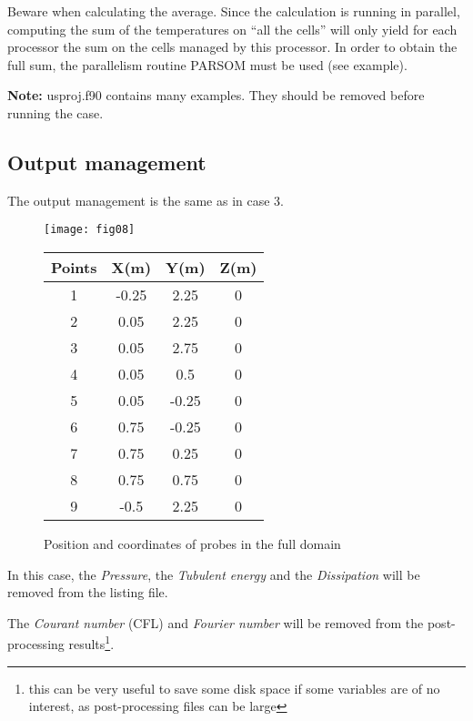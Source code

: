 Beware when calculating the average. Since the calculation is running in
parallel, computing the sum of the temperatures on ``all the cells'' will only
yield for each processor the sum on the cells managed by this processor. In
order to obtain the full sum, the parallelism routine PARSOM must be used (see
example).

\textbf{Note:} usproj.f90 contains many examples. They should be removed before
running the case.


        \subsection{Output management}

The output management is the same as in case 3.

\begin{figure}[htp]
\parbox{8cm}{%
\centerline{\texttt{[image: fig08]}}}
\parbox{7cm}{%
\begin{center}
\begin{tabular}{|c|c|c|c|}
\hline
Points & X(m) & Y(m) & Z(m)\\
\hline
1 & -0.25 & 2.25 & 0 \\
\hline
2 & 0.05 & 2.25 & 0 \\
\hline
3 & 0.05 & 2.75 & 0 \\
\hline
4 & 0.05 & 0.5 & 0 \\
\hline
5 & 0.05 & -0.25 & 0 \\
\hline
6 & 0.75 & -0.25 & 0 \\
\hline
7 & 0.75 & 0.25 & 0 \\
\hline
8 & 0.75 & 0.75 & 0 \\
\hline
9 & -0.5 & 2.25 & 0 \\
\hline
\end{tabular}
\end{center}
}
\caption{Position and coordinates of probes in the full domain}
\label{figante42}
\end{figure}

In this case, the {\itshape Pressure}, the {\itshape Tubulent energy} and the
{\itshape Dissipation} will be removed from the listing file.

The {\itshape Courant number} (CFL) and {\itshape Fourier number} will be
removed from the
post-processing results\footnote{this can be very useful to save some disk space
if some variables are of no interest, as post-processing files can be large}.

